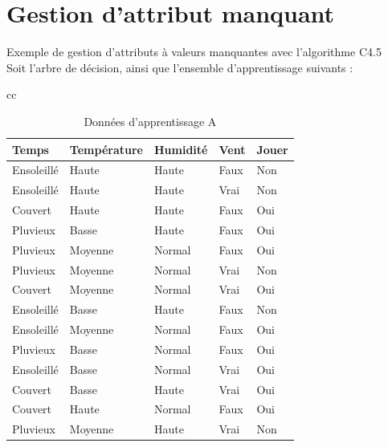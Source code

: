 \documentclass[a4paper, 11pt]{report}
\begin{document}
\section{Gestion d'attribut manquant} 
Exemple de gestion d'attributs à valeurs manquantes avec l'algorithme C4.5\\
Soit l'arbre de décision, ainsi que l'ensemble d'apprentissage suivants :









\begin{table}[!h]
\begin{small}
\begin{tabular}{cc}

    \begin{minipage}{.5\linewidth}
   
\begin{footnotesize}
\begin{tabular}{| l | l | l | l | l |}
\hline
Temps & Température & Humidité & Vent & Jouer \\
\hline
Ensoleillé & Haute & Haute & Faux & \cellcolor{green}Non \\
\hline
Ensoleillé & Haute & Haute & Vrai & \cellcolor{green}Non \\
\hline
Couvert & Haute & Haute & Faux & \cellcolor{yellow}Oui \\
\hline
Pluvieux & Basse & Haute & Faux & \cellcolor{yellow}Oui \\
\hline
Pluvieux & Moyenne & Normal & Faux & \cellcolor{yellow}Oui \\
\hline
Pluvieux & Moyenne & Normal & Vrai &  \cellcolor{green}Non \\
\hline
Couvert & Moyenne & Normal & Vrai &  \cellcolor{yellow}Oui \\
\hline
Ensoleillé & Basse & Haute & Faux &  \cellcolor{green}Non \\
\hline
Ensoleillé & Moyenne & Normal & Faux &  \cellcolor{yellow}Oui \\
\hline
Pluvieux & Basse & Normal & Faux &  \cellcolor{yellow}Oui \\
\hline
Ensoleillé & Basse & Normal & Vrai &  \cellcolor{yellow}Oui \\
\hline
Couvert & Basse & Haute & Vrai &  \cellcolor{yellow}Oui \\
\hline
Couvert & Haute & Normal & Faux &  \cellcolor{yellow}Oui \\
\hline
Pluvieux & Moyenne & Haute & Vrai &  \cellcolor{green}Non \\
\hline
\end{tabular}
\caption{Données d'apprentissage A}
\end{footnotesize}



\end{minipage}
\end{tabular}
\end{small}
\end{table}
\end{document}
